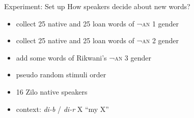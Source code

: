 \documentclass[13pt, t]{beamer}
\begin{document}


\begin{frame}{Experiment: Set up}
\alert{How speakers decide about new words?}
\begin{itemize}
\item collect 25 native and 25 loan words of \textsc{¬an} 1 gender
\item collect 25 native and 25 loan words of \textsc{¬an} 2 gender
\item add some words of Rikwani's \textsc{¬an} 3 gender
\item pseudo random stimuli order
\item 16 Zilo native speakers
\item context:  \textit{di-b} / \textit{di-r} X ``my  X''
\end{itemize}
\end{frame}
\end{document}
